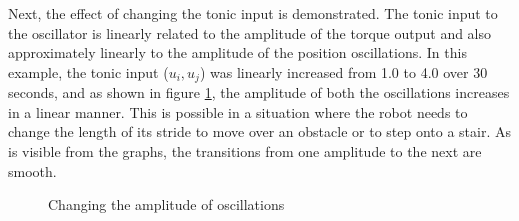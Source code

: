 \documentclass[12pt,twoside]{article}
\theoremstyle{plain}
\theoremstyle{definition}
\theoremstyle{remark}
\newcommand{\forceindent}{\leavevmode{\parindent=2em\indent}}
\begin{document}
\forceindent Next, the effect of changing the tonic input is demonstrated. 
The tonic input to the oscillator is linearly related to the amplitude of the torque output and also approximately linearly to the amplitude of the position oscillations. In this example, the tonic input ($u_i,u_j$) was linearly increased from 1.0 to 4.0 over 30 seconds, and as shown in figure \ref{fig:change-amp}, the amplitude of both the oscillations increases in a linear manner. This is possible in a situation where the robot needs to change the length of its stride to move over an obstacle or to step onto a stair. As is visible from the graphs, the transitions from one amplitude to the next are smooth.

\begin{figure}[H]
\centering     %
{}
\caption{Changing the amplitude of oscillations}
\label{fig:change-amp}
\end{figure}
\end{document}
